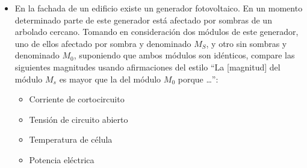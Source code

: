 \documentclass[article, a4paper]{memoir}
\begin{document}
\begin{itemize}
\item En la fachada de un edificio existe un generador fotovoltaico. En un
momento determinado parte de este generador está afectado por
sombras de un arbolado cercano. Tomando en consideración dos módulos
de este generador, uno de ellos afectado por sombra y denominado
\(M_S\), y otro sin sombras y denominado \(M_0\), suponiendo que ambos
módulos son idénticos, compare las siguientes magnitudes usando
afirmaciones del estilo ``La [magnitud] del módulo \(M_s\) es mayor
que la del módulo \(M_0\) porque \ldots{}'':
\begin{itemize}
\item Corriente de cortocircuito
\item Tensión de circuito abierto
\item Temperatura de célula
\item Potencia eléctrica
\end{itemize}
\end{itemize}
\end{document}
